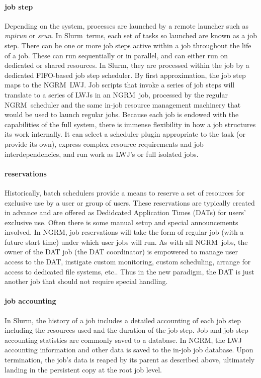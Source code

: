 \documentclass[10pt]{article}
\newcommand{\ngrm}{NGRM}
\newcommand{\slurm}{Slurm}
\begin{document}
\paragraph{job step}
Depending on the system, processes are launched by a remote launcher such
as {\em mpirun} or {\em srun}.  In \slurm\ terms, each set of tasks so launched are
known as a job step.  There can be one or more job steps active within
a job throughout the life of a job.  These can run sequentially or in
parallel, and can either run on dedicated or shared resources.
In \slurm, they are processed within the job by a dedicated FIFO-based
job step scheduler.
By first approximation, the job step maps to the \ngrm\ LWJ. 
Job scripts that invoke a series of job steps will translate
to a series of LWJs in an \ngrm\ job, processed by the regular \ngrm\ scheduler
and the same in-job resource management machinery that would be used to
launch regular jobs.  Because each job is endowed with the capabilities
of the full system, there is immense flexibility in how a job structures
its work internally.  It can select a scheduler plugin appropriate to the
task (or provide its own), express complex resource requirements and job
interdependencies, and run work as LWJ's or full isolated jobs.

\paragraph{reservations}
Historically, batch schedulers provide a means to reserve a set of
resources for exclusive use by a user or group of users.  These
reservations are typically created in advance and are offered as
Dedidcated Application Times (DATs) for users' exclusive use.
Often there is some manual setup and special announcements involved.
In \ngrm, job reservations will take the form of regular job (with a
future start time) under which user jobs will run.  As with all \ngrm\ jobs,
the owner of the DAT job (the DAT coordinator) is empowered to manage
user access to the DAT, instigate custom monitoring, custom scheduling, 
arrange for access to dedicated file systems, etc..
Thus in the new paradigm, the DAT is just another job that should not require
special handling.

\paragraph{job accounting}
In \slurm, the history of a job includes a detailed accounting of each job step
including the resources used and the duration of the job step.
Job and job step accounting statistics are commonly saved to a database.
In \ngrm, the LWJ accounting information and other data is saved to the
in-job job database.  Upon termination, the job's data is reaped by its
parent as described above, ultimately landing in the persistent copy
at the root job level.
\end{document}
